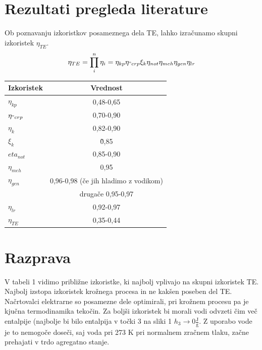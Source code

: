 \documentclass[a4paper,10pt]{article}
\begin{document}
\begin{multicols}{2}
\section{Rezultati pregleda literature}
Ob poznavanju izkoristkov posameznega dela TE, lahko izračunamo skupni izkoristek  $\eta_{TE}$.\citep{Gasperic}
\begin{equation}
	\eta_{TE}= \prod_i^n\eta_i=\eta_{kp}\eta_{"crp}\xi_k\eta_{not}\eta_{meh}\eta_{gen}\eta_{lr}
\end{equation}
\begin{minipage}{\linewidth}
	\label{tab:title}
	\begin{tabular}{  l c }
  		\hline
  		 \bf{Izkoristek} & \bf{Vrednost} \\
		\hline
		$\eta_{kp}$			&	0,48-0,65 	\\ \hline
		$\eta_{"crp}$ 		&	0,70-0,90	\\\hline
		$\eta_k	$			&	0,82-0,90	\\\hline
		$\xi_k	$			&	\~0,85	\\\hline
		$eta_{not}$			&	0,85-0,90	\\	\hline
		$\eta_{meh}$		&	0,95	\\\hline
		$\eta_{gen}$		&	0,96-0,98 (če jih hladimo z vodikom)\\
							&	 drugače 0,95-0,97 		\\\hline
		$\eta_{lr}$			&	0,92-0,97	\\\hline
		$\eta_{TE}$			&	0,35-0,44		\\\hline
  		\hline
	\end{tabular}
\end{minipage}
\vspace{5mm} %
\section{Razprava}
V tabeli 1 vidimo približne izkoristke, ki najbolj vplivajo na skupni izkoristek TE. Najbolj izstopa izkoristek krožnega procesa in ne kakšen poseben del TE.
Načrtovalci elektrarne so posamezne dele optimirali, pri krožnem procesu pa je kjučna termodinamika tekočin. Za boljši izkoristek bi morali  vodi odvzeti čim več entalpije (najbolje bi bilo entalpija v točki 3 na sliki 1 $h_3\rightarrow 0 \frac{\mathrm{J}}{\mathrm{g}}$. Z uporabo vode je to nemogoče doseči, saj voda pri 273 K pri normalnem zračnem tlaku, začne prehajati v trdo agregatno stanje.

\end{multicols}
\end{document}
